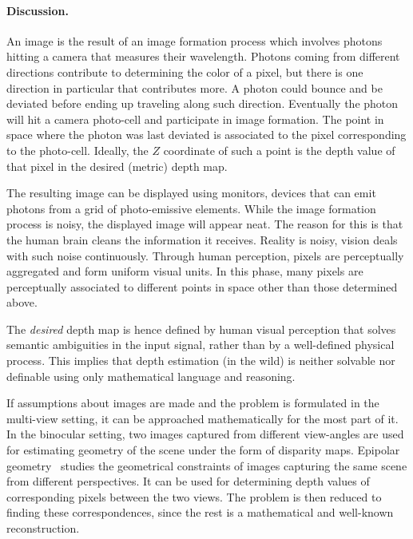 \vspace{0.5cm}

\paragraph{Discussion.}
An image is the result of an image formation process which involves photons hitting a camera that measures their wavelength.
Photons coming from different directions contribute to determining the color of a pixel, but there is one direction in particular that contributes more.
A photon could bounce and be deviated before ending up traveling along such direction.
Eventually the photon will hit a camera photo-cell and participate in image formation.
The point in space where the photon was last deviated is associated to the pixel corresponding to the photo-cell.
Ideally, the $Z$ coordinate of such a point is the depth value of that pixel in the desired (metric) depth map.

The resulting image can be displayed using monitors, devices that can emit photons from a grid of photo-emissive elements.
While the image formation process is noisy, the displayed image will appear neat.
The reason for this is that the human brain cleans the information it receives.
Reality is noisy, vision deals with such noise continuously.
Through human perception, pixels are perceptually aggregated and form uniform visual units.
In this phase, many pixels are perceptually associated to different points in space other than those determined above.

The \textit{desired} depth map is hence defined by human visual perception that solves semantic ambiguities in the input signal, rather than by a well-defined physical process.
This implies that depth estimation (in the wild) is neither solvable nor definable using only mathematical language and reasoning.

\vspace{0.5cm}

If assumptions about images are made and the problem is formulated in the multi-view setting, it can be approached mathematically for the most part of it.
In the binocular setting, two images captured from different view-angles are used for estimating geometry of the scene under the form of disparity maps.
Epipolar geometry~\cite{multiview} studies the geometrical constraints of images capturing the same scene from different perspectives.
It can be used for determining depth values of corresponding pixels between the two views.
The problem is then reduced to finding these correspondences, since the rest is a mathematical and well-known reconstruction.

